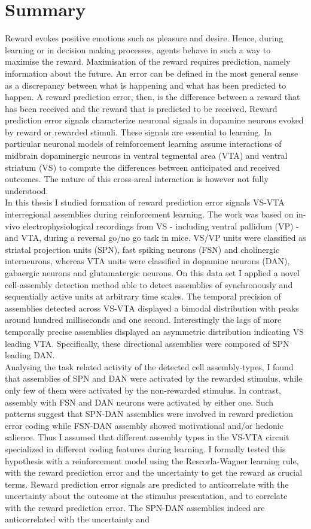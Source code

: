 \section*{Summary}
Reward evokes positive emotions such as pleasure and desire. Hence, during learning or in decision making processes, agents behave in such a way to maximise the reward. Maximisation of the reward requires prediction, namely information about the future. An error can be defined in the most general sense as a discrepancy between what is happening and what has been predicted to happen. A reward prediction error, then, is the difference between a reward that has been received and the reward that is predicted to be received. Reward prediction error signals characterize neuronal signals in dopamine neurons evoked by reward or rewarded stimuli. These signals are essential to learning. In particular neuronal models of reinforcement learning assume interactions of midbrain dopaminergic neurons in ventral tegmental area (VTA) and ventral striatum (VS) to compute the differences between anticipated and received outcomes. The nature of this cross-areal interaction is however not fully understood.\\In this thesis I studied formation of reward prediction error signals VS-VTA interregional assemblies during reinforcement learning. The work was based on in-vivo electrophysiological recordings from VS - including ventral pallidum (VP) - and VTA, during a reversal go/no go task in mice. VS/VP units were classified as striatal projection units (SPN), fast spiking neurons (FSN) and cholinergic interneurons, whereas VTA units were classified in dopamine neurons (DAN), gabaergic neurons and glutamatergic neurons. On this data set I applied a novel cell-assembly detection method able to detect assemblies of synchronously and sequentially active units at arbitrary time scales. The temporal precision of assemblies detected across VS-VTA displayed a bimodal distribution with peaks around hundred milliseconds and one second. Interestingly the lags of more temporally precise assemblies displayed an asymmetric distribution indicating VS leading VTA. Specifically, these directional assemblies were composed of SPN leading DAN.\\Analysing the task related activity of the detected cell assembly-types, I found that assemblies of SPN and DAN were activated by the rewarded stimulus, while only few of them were activated by the non-rewarded stimulus. In contrast, assembly with FSN and DAN neurons were activated by either one. Such patterns suggest that SPN-DAN assemblies were involved in reward prediction error coding while FSN-DAN assembly showed motivational and/or hedonic salience. Thus I assumed that different assembly types in the VS-VTA circuit specialized in different coding features during learning. I formally tested this hypothesis with a reinforcement model using the Rescorla-Wagner learning rule, with the reward prediction error and the uncertainty to get the reward as crucial terms. Reward prediction error signals are predicted to anticorrelate with the uncertainty about the outcome at the stimulus presentation, and to correlate with the reward prediction error. The SPN-DAN assemblies indeed are anticorrelated with the uncertainty and 
